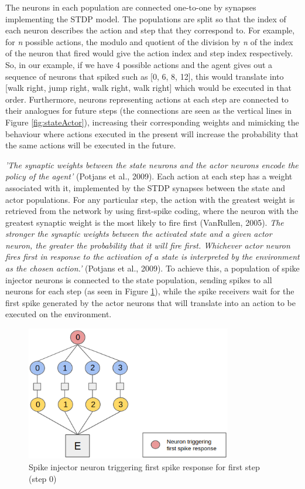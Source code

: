 \documentclass[10pt]{article}
\begin{document}
    The neurons in each population are connected one-to-one by synapses implementing the STDP model. The populations are split so that the index of each neuron describes the action and step that they correspond to. For example, for \textit{n} possible actions, the modulo and quotient of the division by \textit{n} of the index of the neuron that fired would give the action index and step index respectively. So, in our example, if we have 4 possible actions and the agent gives out a sequence of neurons that spiked such as [0, 6, 8, 12], this would translate into [walk right, jump right, walk right, walk right] which would be executed in that order. Furthermore, neurons representing actions at each step are connected to their analogues for future steps (the connections are seen as the vertical lines in Figure \ref{fig:stateActor}), increasing their corresponding weights and mimicking the behaviour where actions executed in the present will increase the probability that the same actions will be executed in the future.

    \textit{'The synaptic weights between the state neurons and the actor neurons encode the policy of the agent'} (Potjans et al., 2009). Each action at each step has a weight associated with it, implemented by the STDP synapses between the state and actor populations. For any particular step, the action with the greatest weight is retrieved from the network by using first-spike coding, where the neuron with the greatest synaptic weight is the most likely to fire first (VanRullen, 2005). \textit{The stronger the synaptic weights between the activated state and a given actor
    neuron, the greater the probability that it will fire first. Whichever actor
    neuron fires first in response to the activation of a state is interpreted by
    the environment as the chosen action.'} (Potjans et al., 2009). To achieve this, a population of spike injector neurons is connected to the state population, sending spikes to all neurons for each step (as seen in Figure \ref{fig:firstSpike}), while the spike receivers wait for the first spike generated by the actor neurons that will translate into an action to be executed on the environment.

    \setcounter{figure}{5}

    \begin{figure}[ht!]
    \centering
    \includegraphics[width=90mm]{./firstSpike.png}
    \caption{Spike injector neuron triggering first spike response for first step (step 0) \label{overflow}}
    \label{fig:firstSpike}
    \end{figure}
\end{document}
